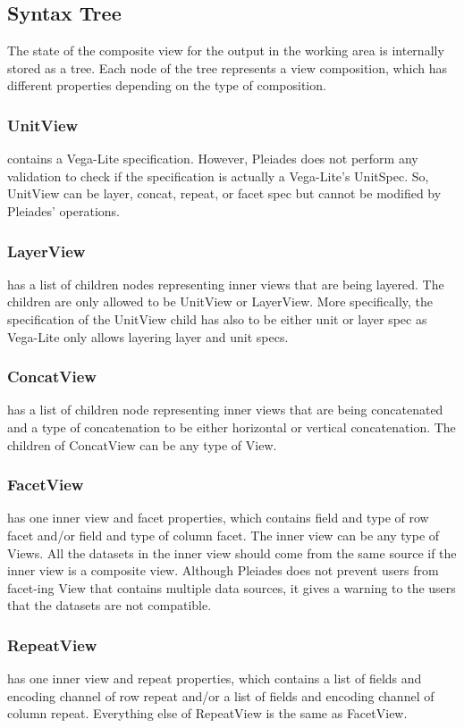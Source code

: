 \documentclass[journal]{vgtc}                %
\begin{document}
\subsection{Syntax Tree}
The state of the composite view for the output in the working area is internally
stored as a tree. Each node of the tree represents a view composition, which has
different properties depending on the type of composition.

\subsubsection{UnitView} contains a Vega-Lite specification. However, Pleiades does
not perform any validation to check if the specification is actually a Vega-Lite’s
UnitSpec. So, UnitView can be layer, concat, repeat, or facet spec but cannot be
modified by Pleiades’ operations.

\subsubsection{LayerView} has a list of children nodes representing inner views that
are being layered. The children are only allowed to be UnitView or LayerView.
More specifically, the specification of the UnitView child has also to be either
unit or layer spec as Vega-Lite only allows layering layer and unit specs.

\subsubsection{ConcatView} has a list of children node representing inner views that
are being concatenated and a type of concatenation to be either horizontal or
vertical concatenation. The children of ConcatView can be any type of View.

\subsubsection{FacetView} has one inner view and facet properties, which contains
field and type of row facet and/or field and type of column facet. The inner
view can be any type of Views. All the datasets in the inner view should come
from the same source if the inner view is a composite view. Although Pleiades
does not prevent users from facet-ing View that contains multiple data sources,
it gives a warning to the users that the datasets are not compatible.

\subsubsection{RepeatView} has one inner view and repeat properties, which contains
a list of fields and encoding channel of row repeat and/or a list of fields and
encoding channel of column repeat. Everything else of RepeatView is the same as
FacetView.
\end{document}
